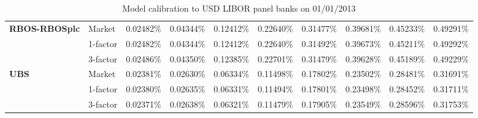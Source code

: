 \documentclass[12pt,a4paper]{article}
\theoremstyle{plain}
\numberwithin{equation}{section}
\begin{document}
{\begin{table}[t]
{\begin{tabular}{|rl|cccccccc|}
     \hline
     \hline
    \multicolumn{1}{|l}{\textbf{RBOS-RBOSplc}} & Market & 0.02482\% & 0.04344\% & 0.12412\% & 0.22640\% & 0.31477\% & 0.39681\% & 0.45233\% & 0.49291\% \\
\cline{3-10}          & 1-factor & 0.02482\% & 0.04344\% & 0.12412\% & 0.22640\% & 0.31492\% & 0.39673\% & 0.45211\% & 0.49292\% \\
          & 3-factor & 0.02486\% & 0.04350\% & 0.12385\% & 0.22701\% & 0.31479\% & 0.39628\% & 0.45189\% & 0.49229\% \\
      \hline
   \hline
    \multicolumn{1}{|l}{\textbf{UBS}} & Market & 0.02381\% & 0.02630\% & 0.06334\% & 0.11498\% & 0.17802\% & 0.23502\% & 0.28481\% & 0.31691\% \\
\cline{3-10}          & 1-factor & 0.02380\% & 0.02635\% & 0.06331\% & 0.11494\% & 0.17801\% & 0.23498\% & 0.28452\% & 0.31711\% \\
          & 3-factor & 0.02371\% & 0.02638\% & 0.06321\% & 0.11479\% & 0.17905\% & 0.23549\% & 0.28596\% & 0.31753\% \\
    \hline
    \end{tabular}%
    }
    \caption{Model calibration to USD LIBOR panel banks on 01/01/2013 }
  \label{CDSfit130101}%
\end{table}%

}
\end{document}
